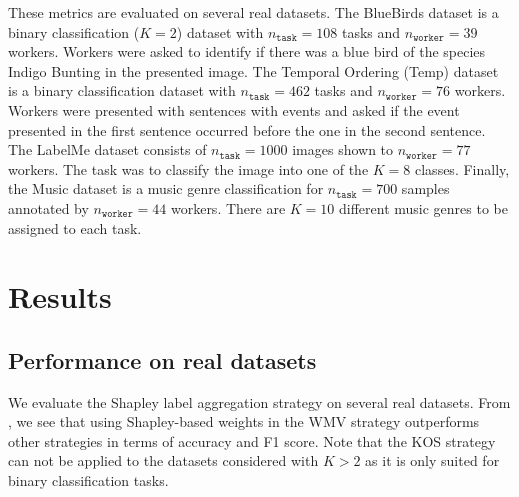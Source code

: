\documentclass{cap2024}
\begin{document}
These metrics are evaluated on several real datasets.
The BlueBirds dataset \citep{WelinderEtal10b} is a binary classification ($K=2$) dataset with $n_\texttt{task}=108$ tasks and $n_\texttt{worker}=39$ workers. Workers were asked to identify if there was a blue bird of the species Indigo Bunting in the presented image.
The Temporal Ordering (Temp) \citep{snow_cheap_2008} dataset is a binary classification dataset with $n_\texttt{task}=462$ tasks and $n_\texttt{worker}=76$ workers. Workers were presented with sentences with events and asked if the event presented in the first sentence occurred before the one in the second sentence.
The LabelMe dataset \citep{rodrigues2018deep} consists of $n_\texttt{task}=1000$ images shown to $n_\texttt{worker}=77$ workers. The task was to classify the image into one of the $K=8$ classes.
Finally, the Music dataset \citep{rodrigues2014gaussian} is a music genre classification for $n_\texttt{task}=700$ samples annotated by $n_\texttt{worker}=44$ workers. There are $K=10$ different music genres to be assigned to each task.

\section{Results}
\label{sec:results}
\subsection{Performance on real datasets}

We evaluate the Shapley label aggregation strategy on several real datasets.
From , we see that using Shapley-based weights in the WMV strategy outperforms other strategies in terms of accuracy and F1 score.
Note that the KOS strategy can not be applied to the datasets considered with $K>2$ as it is only suited for binary classification tasks.
\end{document}
